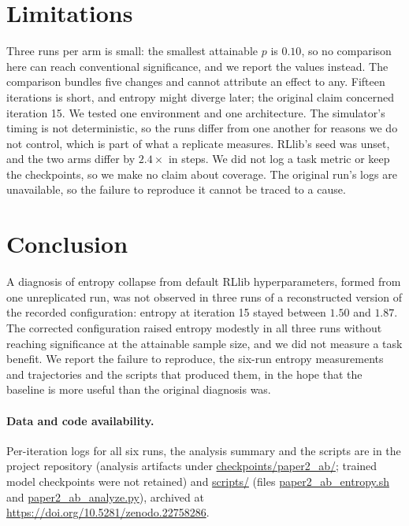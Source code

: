 \documentclass[12pt]{article}
\begin{document}
\section{Limitations}
Three runs per arm is small: the smallest attainable $p$ is $0.10$, so no
comparison here can reach conventional significance, and we report the
values instead. The comparison bundles five changes and cannot attribute an
effect to any. Fifteen iterations is short, and entropy might diverge later;
the original claim concerned iteration 15. We tested one environment and one
architecture. The simulator's timing is not deterministic, so the runs differ
from one another for reasons we do not control, which is part of what a
replicate measures. RLlib's seed was unset, and the two arms differ by $2.4\times$ in steps. We did not log a task metric or keep the checkpoints, so
we make no claim about coverage. The original run's logs are unavailable, so
the failure to reproduce it cannot be traced to a cause.

\section{Conclusion}
A diagnosis of entropy collapse from default RLlib hyperparameters,
formed from one unreplicated run, was not observed in three runs of a reconstructed
version of the recorded configuration: entropy at iteration 15 stayed between $1.50$ and
$1.87$. The corrected configuration raised entropy modestly in all three
runs without reaching significance at the attainable sample size, and we did
not measure a task benefit. We report the failure to reproduce, the
six-run entropy measurements and trajectories and the scripts that produced them, in the
hope that the baseline is more useful than the original diagnosis was.

\paragraph{Data and code availability.} Per-iteration logs for all six runs,
the analysis summary and the scripts are in the project repository (analysis artifacts under
\url{checkpoints/paper2_ab/}; trained model checkpoints were not retained) and \url{scripts/} (files
\url{paper2_ab_entropy.sh} and \url{paper2_ab_analyze.py}), archived at
\url{https://doi.org/10.5281/zenodo.22758286}.

\appendix
\end{document}
